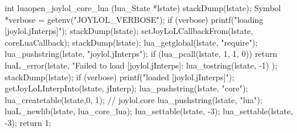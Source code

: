 int luaopen_joylol_core_lua (lua_State *lstate) {
  stackDump(lstate);
  Symbol *verbose = getenv("JOYLOL_VERBOSE");
  if (verbose) printf("loading [joylol.jInterps]\n");
  stackDump(lstate);
  setJoyLoLCallbackFrom(lstate, coreLuaCallback);
  stackDump(lstate);
  lua_getglobal(lstate, "require");
  lua_pushstring(lstate, "joylol.jInterps");
  if (lua_pcall(lstate, 1, 1, 0)) {
    return luaL_error(lstate,
      "Failed to load [joylol.jInterps]\nERROR:\n%
      lua_tostring(lstate, -1)
    );
  }
  stackDump(lstate);
  if (verbose) printf("loaded [joylol.jInterps]\n");
  getJoyLoLInterpInto(lstate, jInterp);
  lua_pushstring(lstate, "core");
  lua_createtable(lstate,0, 1); // joylol.core 
  lua_pushstring(lstate, "lua");
  luaL_newlib(lstate, lua_core_lua);
  lua_settable(lstate, -3);
  lua_settable(lstate, -3);
  return 1;
}
\stopCCode